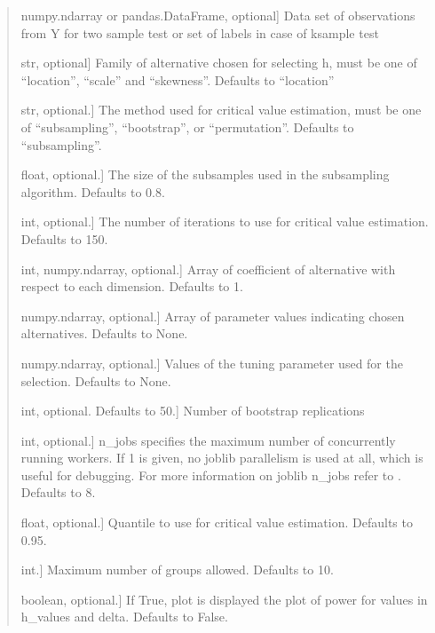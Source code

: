 \documentclass[letterpaper,10pt,english,openany,oneside]{sphinxmanual}
\begin{document}
{{{{\begin{fulllineitems}
\begin{quote}
\begin{description}
\sphinxlineitem{y}{[}numpy.ndarray or pandas.DataFrame, optional{]}
\sphinxAtStartPar
Data set of observations from Y for two sample test
or set of labels in case of k\sphinxhyphen{}sample test

\sphinxlineitem{alternative}{[}str, optional{]}
\sphinxAtStartPar
Family of alternative chosen for selecting h,
must be one of “location”, “scale” and “skewness”.
Defaults to “location”

\sphinxlineitem{method}{[}str, optional.{]}
\sphinxAtStartPar
The method used for critical value estimation,
must be one of “subsampling”, “bootstrap”, or “permutation”.
Defaults to “subsampling”.

\sphinxlineitem{b}{[}float, optional.{]}
\sphinxAtStartPar
The size of the subsamples used in the subsampling algorithm.
Defaults to 0.8.

\sphinxlineitem{num\_iter}{[}int, optional.{]}
\sphinxAtStartPar
The number of iterations to use for critical value estimation.
Defaults to 150.

\sphinxlineitem{delta\_dim}{[}int, numpy.ndarray, optional.{]}
\sphinxAtStartPar
Array of coefficient of alternative with respect to each dimension.
Defaults to 1.

\sphinxlineitem{delta}{[}numpy.ndarray, optional.{]}
\sphinxAtStartPar
Array of parameter values indicating chosen alternatives.
Defaults to None.

\sphinxlineitem{h\_values}{[}numpy.ndarray, optional.{]}
\sphinxAtStartPar
Values of the tuning parameter used for the selection.
Defaults to None.

\sphinxlineitem{n\_rep}{[}int, optional. Defaults to 50.{]}
\sphinxAtStartPar
Number of bootstrap replications

\sphinxlineitem{n\_jobs}{[}int, optional.{]}
\sphinxAtStartPar
n\_jobs specifies the maximum number of concurrently running workers.
If 1 is given, no joblib parallelism is used at all,
which is useful for debugging. For more information on joblib n\_jobs
refer to \sphinxhyphen{} .
Defaults to 8.

\sphinxlineitem{quantile}{[}float, optional.{]}
\sphinxAtStartPar
Quantile to use for critical value estimation. Defaults to 0.95.

\sphinxlineitem{k\_threshold}{[}int.{]}
\sphinxAtStartPar
Maximum number of groups allowed. Defaults to 10.

\sphinxlineitem{power\_plot}{[}boolean, optional.{]}
\sphinxAtStartPar
If True, plot is displayed the plot of power for
values in h\_values and delta. Defaults to False.


\end{description}
\end{quote}
\end{fulllineitems}}}}}
\end{document}
